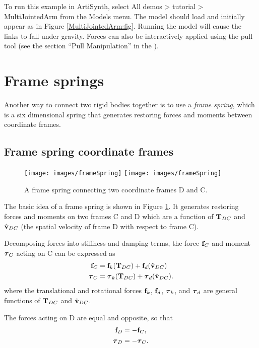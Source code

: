 To run this example in ArtiSynth, select {\sf All demos > tutorial >
MultiJointedArm} from the {\sf Models} menu. The model should load and
initially appear as in Figure \ref{MultiJointedArm:fig}.  Running the model
will cause the links to fall under gravity.  Forces can also be interactively
applied using the pull tool (see the section ``Pull Manipulation'' in the
).

\section{Frame springs}
\label{FrameSprings:sec}

Another way to connect two rigid bodies together is to use a {\it
frame spring}, which is a six dimensional spring that generates
restoring forces and moments between coordinate frames.

\subsection{Frame spring coordinate frames}

\begin{figure}[ht]
\begin{center}
 \iflatexml
   \texttt{[image: images/frameSpring]}
 \else
   \texttt{[image: images/frameSpring]}
 \fi
\end{center}
\caption{A frame spring connecting two coordinate frames D and C.}
\label{frameSpring:fig}
\end{figure}

The basic idea of a frame spring is shown in Figure
\ref{frameSpring:fig}. It generates restoring forces and moments on
two frames C and D which are a function of ${\bf T}_{DC}$ and $\hat{{\bf v}}_{DC}$
(the spatial velocity of frame D with respect to frame C).

Decomposing forces into stiffness and damping terms, the force
${\bf f}_C$ and moment $\boldsymbol\tau_C$ acting on C can be expressed as 
%
\begin{align}
{\bf f}_C & = {\bf f}_{k} ({\bf T}_{DC}) + {\bf f}_{d} (\hat{{\bf v}}_{DC}) \notag \\
\boldsymbol\tau_C & = \boldsymbol\tau_{k} ({\bf T}_{DC}) + \boldsymbol\tau_{d} (\hat{{\bf v}}_{DC}).
\label{ftauC:eqn}
\end{align}
%
where the translational and rotational forces ${\bf f}_{k}$, ${\bf f}_{d}$,
$\boldsymbol\tau_{k}$, and $\boldsymbol\tau_{d}$ are general functions of ${\bf T}_{DC}$ and
$\hat{{\bf v}}_{DC}$.

The forces acting on D are equal and opposite, so that
%
\begin{align}
{\bf f}_D & = - {\bf f}_C, \notag \\
\boldsymbol\tau_D & = - \boldsymbol\tau_C.
\label{ftau2:eqn}
\end{align}
%


